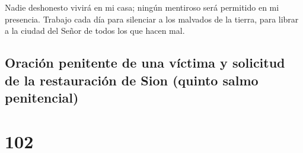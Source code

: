  Nadie deshonesto vivirá en mi casa; ningún mentiroso será
permitido en mi presencia.  Trabajo cada día para silenciar
a los malvados de la tierra, para librar a la ciudad del Señor de todos
los que hacen mal.

\hypertarget{oraciuxf3n-penitente-de-una-vuxedctima-y-solicitud-de-la-restauraciuxf3n-de-sion-quinto-salmo-penitencial}{%
\subsection{Oración penitente de una víctima y solicitud de la
restauración de Sion (quinto salmo
penitencial)}\label{oraciuxf3n-penitente-de-una-vuxedctima-y-solicitud-de-la-restauraciuxf3n-de-sion-quinto-salmo-penitencial}}

\hypertarget{section-101}{%
\section{102}\label{section-101}}

